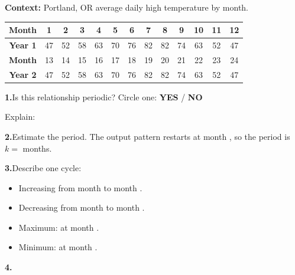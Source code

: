 \documentclass[10pt]{article}
\begin{document}
\begin{tcolorbox}[colback=white, colframe=black!40,
    title=\textbf{Tier R --- Reinforce (Key)},
    fonttitle=\bfseries, arc=2mm, left=3mm, right=3mm, top=2mm, bottom=2mm]

\textbf{Context:} Portland, OR average daily high temperature by month.

\begin{center}
\renewcommand{\arraystretch}{1.35}
\small
\begin{tabular}{|c|c|c|c|c|c|c|c|c|c|c|c|c|}
\hline
\textbf{Month} & 1 & 2 & 3 & 4 & 5 & 6 & 7 & 8 & 9 & 10 & 11 & 12 \\
\hline
\textbf{Year 1} & 47 & 52 & 58 & 63 & 70 & 76 & 82 & 82 & 74 & 63 & 52 & 47 \\
\hline
\textbf{Month} & 13 & 14 & 15 & 16 & 17 & 18 & 19 & 20 & 21 & 22 & 23 & 24 \\
\hline
\textbf{Year 2} & 47 & 52 & 58 & 63 & 70 & 76 & 82 & 82 & 74 & 63 & 52 & 47 \\
\hline
\end{tabular}
\end{center}

\vspace{6pt}
\textbf{1.}\quad Is this relationship periodic? Circle one: \quad \textbf{YES} \quad / \quad \textbf{NO}

Explain: 

\vspace{4pt}
\textbf{2.}\quad Estimate the period. The output pattern restarts at month ,
so the period is $k =$  months.

\vspace{4pt}
\textbf{3.}\quad Describe one cycle:
\begin{itemize}[leftmargin=1.4em, itemsep=4pt]
  \item Increasing from month  to month .
  \item Decreasing from month  to month .
  \item Maximum:  at month .
  \item Minimum:  at month .
\end{itemize}

\vspace{4pt}
\textbf{4.}\quad {}

\end{tcolorbox}
\end{document}
